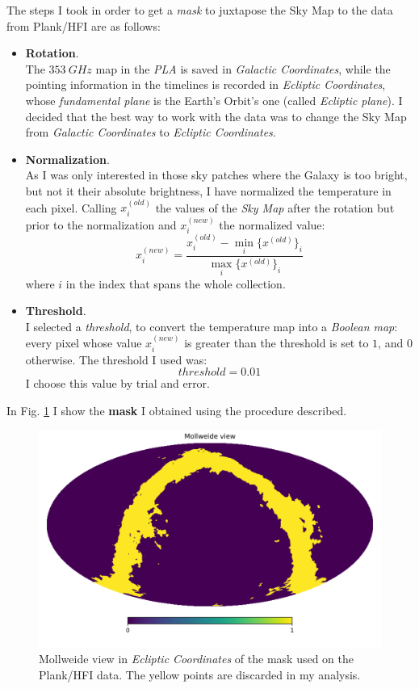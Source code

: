 \documentclass[12pt,a4paper,final]{book}			%
\begin{document}
		The steps I took in order to get a \textit{mask} to juxtapose the Sky Map to the data from Plank/HFI are as follows:
		\begin{itemize}
			\item \textbf{Rotation}.\\
			The $353~\unit{GHz}$ map in the \textit{PLA} is saved in \textit{Galactic Coordinates}, while the pointing information in the timelines is recorded in \textit{Ecliptic Coordinates}, whose \textit{fundamental plane} is the Earth's Orbit's one (called \textit{Ecliptic plane}). 
			I decided that the best way to work with the data was to change the Sky Map from \textit{Galactic Coordinates} to \textit{Ecliptic Coordinates}.  \cite{coordinates_info}
			
			\item \textbf{Normalization}.\\
			As I was only interested in those sky patches where the Galaxy is too bright, but not it their absolute brightness, I have normalized the temperature in each pixel.
			Calling $x^{(old)}_i $ the values of the \textit{Sky Map} after the rotation but prior to the normalization and $x^{(new)}_i $ the normalized value:
			\[
				x^{(new)}_i = \frac { x^{(old)}_i - \min_{i} \{ x^{(old)} \}_i } { \max_{i}  \{ x^{(old)} \}_i } 
			\]
			where $i$ in the index that spans the whole collection.
			
			\item \textbf{Threshold}.\\
			I selected a \textit{threshold}, to convert the temperature map into a \textit{Boolean map}: every pixel whose value $x_i^{(new)}$ is greater than the threshold is set to $1$, and $0$ otherwise.
			The threshold I used was:
			\[
				threshold = 0.01
			\]
			I choose this value by trial and error.
		\end{itemize}
		In Fig. \ref{dust_mask} I show the \textbf{mask} I obtained using the procedure described.
		
		\begin{figure}[t]
		\centering
		\includegraphics[scale=0.6]{figures/Elliptic_galaxy_mask.png}
		\caption{Mollweide view in \textit{Ecliptic Coordinates} of the mask used on the Plank/HFI data. The yellow points are discarded in my analysis.}
		\label{dust_mask}
		\end{figure}
		
\end{document}
